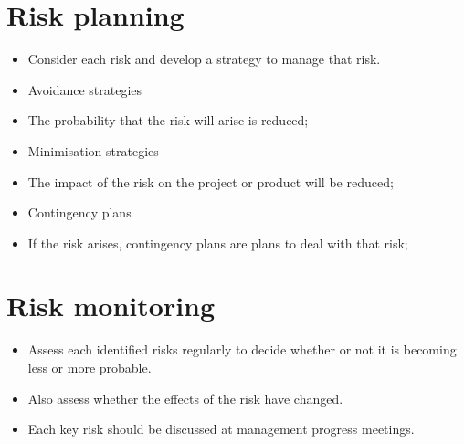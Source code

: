 \section{ Risk planning}
\begin{itemize}

\item Consider each risk and develop a strategy to manage that risk.

\item Avoidance strategies

  \item The probability that the risk will arise is reduced; \item Minimisation strategies
  \item The impact of the risk on the project or product will be reduced; \item Contingency plans
  \item If the risk arises, contingency plans are plans to deal with that risk;
\end{itemize}

\section{Risk monitoring}
\begin{itemize}

\item Assess each identified risks regularly to decide whether or not it is becoming less or more probable.

\item Also assess whether the effects of the risk have changed.

\item Each key risk should be discussed at management progress meetings.

\end{itemize}

